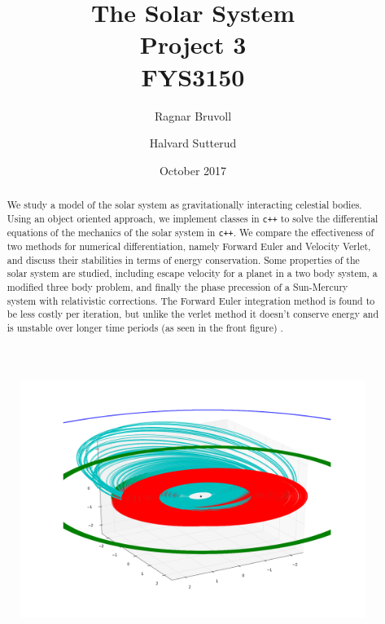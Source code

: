 \documentclass[10pt]{article}
\begin{document}
\title{The Solar System
\\ Project 3
\\ FYS3150}
\author{Ragnar Bruvoll \and Halvard Sutterud}
\date{October 2017}
\maketitle{\begin{center}\end{center}}
\thispagestyle{empty}

\begin{figure}[H]
    \centering
    \includegraphics[width=0.8\linewidth]{../results/front.png}
    \label{fig:name}
\end{figure}

\begin{abstract}
    We study a model of the solar system as gravitationally interacting
    celestial bodies.  Using an object oriented approach, we implement
    classes in \texttt{c++} to solve the differential equations of the
    mechanics of the solar system in \texttt{c++}. We compare the effectiveness of
    two methods for numerical differentiation, namely Forward Euler and
    Velocity Verlet, and discuss their stabilities in terms of energy
    conservation. Some properties of the solar system are studied, including
    escape velocity for a planet in a two body system, a modified three
    body problem, and finally the phase precession of a Sun-Mercury system
    with relativistic corrections. 
    The Forward Euler integration method is found to be less costly per
    iteration, but unlike the verlet method it doesn't conserve energy and
    is unstable over longer time periods (as seen in the front figure) . 
\end{abstract}
\end{document}

